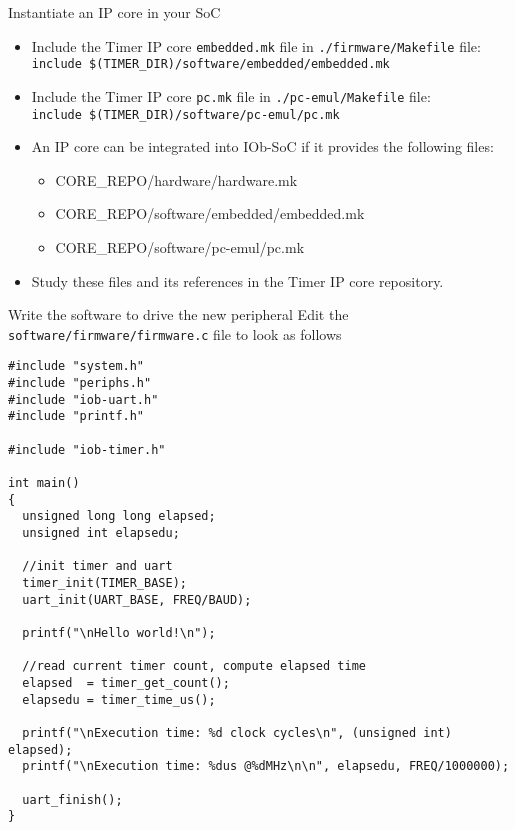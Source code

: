 \documentclass [xcolor=svgnames, t] {beamer}
\begin{document}
\begin{frame}{Instantiate an IP core in your SoC}
  \begin{itemize}
  \item Include the Timer IP core {\tt embedded.mk} file in {\tt ./firmware/Makefile} file:\\
    {\tt \tiny include \$(TIMER\_DIR)/software/embedded/embedded.mk}
  \item Include the Timer IP core {\tt pc.mk} file in {\tt ./pc-emul/Makefile} file:\\
    {\tt \tiny include \$(TIMER\_DIR)/software/pc-emul/pc.mk}
  \item An IP core can be integrated into IOb-SoC if it provides the following files:
    \begin{itemize}
    \item CORE\_REPO/hardware/hardware.mk
    \item CORE\_REPO/software/embedded/embedded.mk
    \item CORE\_REPO/software/pc-emul/pc.mk
    \end{itemize}
  \item Study these files and its references in the Timer IP core repository.
  \end{itemize}
\end{frame}

\begin{frame}[fragile]{Write the software to drive the new peripheral}
  Edit the {\tt software/firmware/firmware.c} file to look as follows
  \begin{tiny}
    \begin{lstlisting}
#include "system.h"
#include "periphs.h"
#include "iob-uart.h"
#include "printf.h"

#include "iob-timer.h"

int main()
{
  unsigned long long elapsed;
  unsigned int elapsedu;

  //init timer and uart
  timer_init(TIMER_BASE);
  uart_init(UART_BASE, FREQ/BAUD);

  printf("\nHello world!\n");

  //read current timer count, compute elapsed time
  elapsed  = timer_get_count();
  elapsedu = timer_time_us();

  printf("\nExecution time: %d clock cycles\n", (unsigned int) elapsed);
  printf("\nExecution time: %dus @%dMHz\n\n", elapsedu, FREQ/1000000);

  uart_finish();
}
    \end{lstlisting}
  \end{tiny}
\end{frame}
\end{document}
